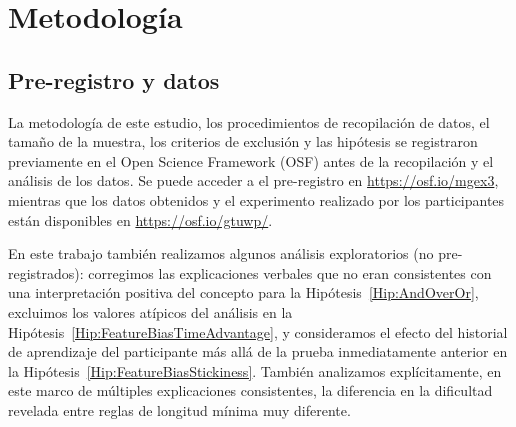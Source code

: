 \section{Metodología}\label{Sec:AdditionalMethodology}


\subsection{Pre-registro y datos}

La metodología de este estudio, los procedimientos de recopilación de datos, el tamaño de la muestra, los criterios de exclusión y las hipótesis se registraron previamente en el Open Science Framework (OSF) antes de la recopilación y el análisis de los datos. Se puede acceder a el pre-registro en \url{https://osf.io/mgex3}, mientras que los datos obtenidos y el experimento realizado por los participantes están disponibles en \url{https://osf.io/gtuwp/}.

En este trabajo también realizamos algunos análisis exploratorios (no pre-registrados): corregimos las explicaciones verbales que no eran consistentes con una interpretación positiva del concepto para la Hipótesis~\ref{Hip:AndOverOr}, excluimos los valores atípicos del análisis en la Hipótesis~\ref{Hip:FeatureBiasTimeAdvantage}, y consideramos el efecto del historial de aprendizaje del participante más allá de la prueba inmediatamente anterior en la Hipótesis~\ref{Hip:FeatureBiasStickiness}. También analizamos explícitamente, en este marco de múltiples explicaciones consistentes, la diferencia en la dificultad revelada entre reglas de longitud mínima muy diferente.

